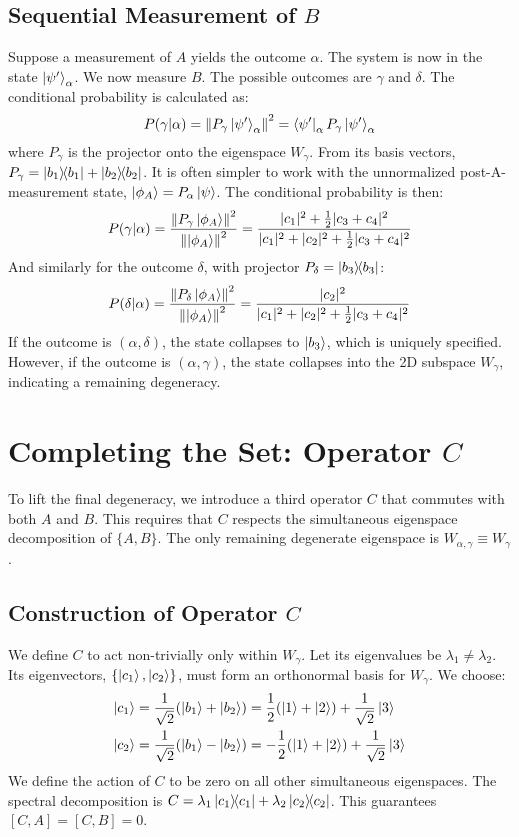 \documentclass[11pt,a4paper]{article}
\begin{document}
\subsection{Sequential Measurement of \texorpdfstring{$B$}{B}}
Suppose a measurement of $A$ yields the outcome $\alpha$. The system is now in
the state $\ket{\psi'}_\alpha$. We now measure $B$. The possible outcomes are
$\gamma$ and $\delta$. The conditional probability is calculated as:
$$
P(\gamma|\alpha) = \norm{P_\gamma \ket{\psi'}_\alpha}^2 = \bra{\psi'}_\alpha
P_\gamma \ket{\psi'}_\alpha
$$
where $P_\gamma$ is the projector onto the eigenspace $W_\gamma$. From its basis
vectors, $P_\gamma = \dyad{b_1}{b_1} + \dyad{b_2}{b_2}$.
It is often simpler to work with the unnormalized post-A-measurement state,
$\ket{\phi_A} = P_\alpha\ket{\psi}$. The conditional probability is then:
$$
P(\gamma|\alpha) = \frac{\norm{P_\gamma \ket{\phi_A}}^2}{\norm{\ket{\phi_A}}^2}
= \frac{|c_1|^2 + \frac{1}{2}|c_3+c_4|^2}{|c_1|^2 + |c_2|^2 +
\frac{1}{2}|c_3+c_4|^2}
$$
And similarly for the outcome $\delta$, with projector $P_\delta = \dyad{b_3}{b_3}$:
$$
P(\delta|\alpha) = \frac{\norm{P_\delta \ket{\phi_A}}^2}{\norm{\ket{\phi_A}}^2}
= \frac{|c_2|^2}{|c_1|^2 + |c_2|^2 + \frac{1}{2}|c_3+c_4|^2}
$$
If the outcome is $(\alpha, \delta)$, the state collapses to $\ket{b_3}$, which
is uniquely specified. However, if the outcome is $(\alpha, \gamma)$, the state
collapses into the 2D subspace $W_\gamma$, indicating a remaining degeneracy.

\section{Completing the Set: Operator \texorpdfstring{$C$}{C}}
To lift the final degeneracy, we introduce a third operator $C$ that commutes
with both $A$ and $B$. This requires that $C$ respects the simultaneous
eigenspace decomposition of $\{A,B\}$. The only remaining degenerate eigenspace
is $W_{\alpha,\gamma} \equiv W_\gamma$.

\subsection{Construction of Operator \texorpdfstring{$C$}{C}}
We define $C$ to act non-trivially only within $W_\gamma$. Let its eigenvalues
be $\lambda_1 \neq \lambda_2$. Its eigenvectors, $\{\ket{c_1}, \ket{c_2}\}$,
must form an orthonormal basis for $W_\gamma$. We choose:
\begin{align*}
  \ket{c_1} &= \frac{1}{\sqrt{2}}(\ket{b_1} + \ket{b_2}) =
  \frac{1}{2}(\ket{1}+\ket{2}) + \frac{1}{\sqrt{2}}\ket{3} \\
  \ket{c_2} &= \frac{1}{\sqrt{2}}(\ket{b_1} - \ket{b_2}) =
  -\frac{1}{2}(\ket{1}+\ket{2}) + \frac{1}{\sqrt{2}}\ket{3}
\end{align*}
We define the action of $C$ to be zero on all other simultaneous eigenspaces.
The spectral decomposition is $C = \lambda_1 \dyad{c_1}{c_1} + \lambda_2
\dyad{c_2}{c_2}$. This guarantees $[C,A]=[C,B]=0$.
\end{document}
